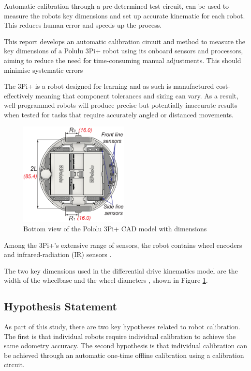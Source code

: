 \documentclass[conference]{IEEEtran}
\begin{document}
Automatic calibration through a pre-determined test circuit, can be used to measure the robots key dimensions and set up accurate kinematic for each robot. This reduces human error and speeds up the process.

This report develops an automatic calibration circuit and method to measure the key dimensions of a Polulu 3Pi+ robot using its onboard sensors and processors, aiming to reduce the need for time-consuming manual adjustments. This should minimise systematic errors \cite{odometry} 

The 3Pi+ is a robot designed for learning and as such is manufactured cost-effectively meaning that component tolerances and sizing can vary. As a result, well-programmed robots will produce precise but potentially inaccurate results when tested for tasks that require accurately angled or distanced movements. 

\begin{figure}[h!]
    \centering
    \includegraphics[width = 0.49\textwidth]{img/robot_schemtatic.png}
    \caption{Bottom view of the Pololu 3Pi+ CAD model with dimensions \cite{pololu_guide}}
    \label{fig:dimensions}
\end{figure}

Among the 3Pi+'s extensive range of sensors, the robot contains wheel encoders and infrared-radiation (IR) sensors \cite{pololu_guide}. 

The two key dimensions used in the differential drive kinematics model are the width of the wheelbase and the wheel diameters \cite{pololu_guide}, shown in Figure \ref{fig:dimensions}.


\subsection{Hypothesis Statement}

As part of this study, there are two key hypotheses related to robot calibration. The first is that individual robots require individual calibration to achieve the same odometry accuracy. The second hypothesis is that individual calibration can be achieved through an automatic one-time offline calibration using a calibration circuit.
\end{document}
